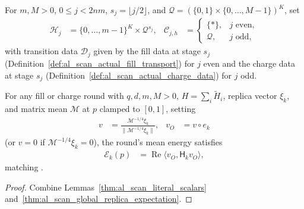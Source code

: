 \begin{definition}
    \label{def:al_scan_actual_round_family}
    \leanok
    For $m,M>0$, $0\le j<2nm$, $s_j=\lfloor j/2\rfloor$, and
    $\mathcal Q=(\{0,1\}\times\{0,\ldots,M-1\})^K$, set
    \begin{align}
        \mathcal H_j     & =\{0,\ldots,m-1\}^K\times\mathcal Q^{s_j}, &
        \mathcal C_{j,h} & =
        \begin{cases}
            \{\ast\},   & j\text{ even}, \\
            \mathcal Q, & j\text{ odd},
        \end{cases}
        \label{eq:al_scan_actual_round_family}
    \end{align}
    with transition data $\mathscr D_j$ given by the fill data at stage $s_j$
    (Definition~\ref{def:al_scan_actual_fill_transport}) for $j$ even and the
    charge data at stage $s_j$ (Definition~\ref{def:al_scan_actual_charge_data})
    for $j$ odd.
\end{definition}

\begin{lemma}
    \label{thm:al_scan_actual_round_global_energy}
    \leanok
    For any fill or charge round with $q,d,m,M>0$, $H=\sum_i\widetilde H_i$,
    replica vector $\xi_k$, and matrix mean $\mathcal M$ at $p$ clamped to
    $[0,1]$, setting
    \begin{align}
        v   & =\frac{\mathcal M^{-1/4}\xi_k}{\|\mathcal M^{-1/4}\xi_k\|}, &
        v_O & =v\circ e_k
        \label{eq:al_scan_round_filtered_vector}
    \end{align}
    (or $v=0$ if $\mathcal M^{-1/4}\xi_k=0$), the round's mean energy satisfies
    \begin{align}
        \mathcal E_k(p)
         & =\operatorname{Re}\langle v_O,\mathsf H_k v_O\rangle,
        \label{eq:al_scan_actual_round_global_energy}
    \end{align}
    matching \cite[Section~9, scanner energy output]{OpenAI2026AreaLaw}.
\end{lemma}
\begin{proof}\leanok
    Combine Lemmas~\ref{thm:al_scan_literal_scalars}
    and~\ref{thm:al_scan_global_replica_expectation}.
\end{proof}

